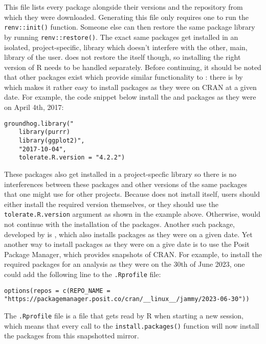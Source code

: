 \documentclass[
  article]{jss}
\begin{document}
This file lists every package alongside their versions and the
repository from which they were downloaded. Generating this file only
requires one to run the \texttt{renv::init()} function. Someone else can
then restore the same package library by running
\texttt{renv::restore()}. The exact same packages get installed in an
isolated, project-specific, library which doesn't interfere with the
other, main, library of the user.  does not restore the
 itself though, so installing the right version of R needs
to be handled separately. Before continuing, it should be noted that
other packages exist which provide similar functionality to :
there is  by \citet{simonsohn2023} which makes it rather
easy to install packages as they were on CRAN at a given date. For
example, the code snippet below install the  and
 packages as they were on April 4th, 2017:

\begin{verbatim}
groundhog.library("
    library(purrr)
    library(ggplot2)",
    "2017-10-04",
    tolerate.R.version = "4.2.2")
\end{verbatim}

These packages also get installed in a project-specfic library so there
is no interferences between these packages and other versions of the
same packages that one might use for other projects. Because
 does not install  itself, users should
either install the required version themselves, or they should use the
\texttt{tolerate.R.version} argument as shown in the example above.
Otherwise,  would not continue with the installation of
the packages. Another such package, developed by \citet{chan2023} is
, which also installs packages as they were on a given date.
Yet another way to install packages as they were on a give date is to
use the Posit Package Manager, which provides snapshots of CRAN. For
example, to install the required packages for an analysis as they were
on the 30th of June 2023, one could add the following line to the
\texttt{.Rprofile} file:

\begin{verbatim}
options(repos = c(REPO_NAME = "https://packagemanager.posit.co/cran/__linux__/jammy/2023-06-30"))
\end{verbatim}

The \texttt{.Rprofile} file is a file that gets read by R when starting
a new session, which means that every call to the
\texttt{install.packages()} function will now install the packages from
this snapshotted mirror.
\end{document}
